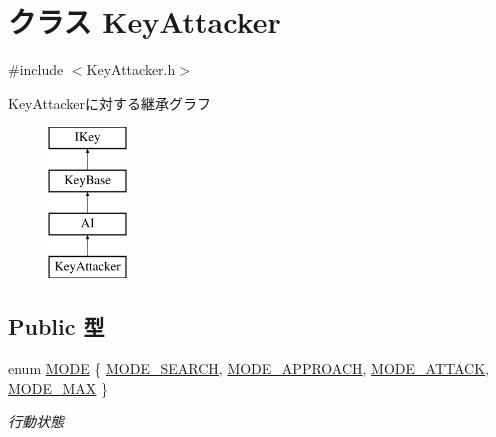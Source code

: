 \hypertarget{class_key_attacker}{\section{クラス Key\-Attacker}
\label{class_key_attacker}
}


{\ttfamily \#include $<$Key\-Attacker.\-h$>$}

Key\-Attackerに対する継承グラフ\begin{figure}[H]
\begin{center}
\leavevmode
\includegraphics[height=4.000000cm]{d9/db2/class_key_attacker}
\end{center}
\end{figure}
\subsection*{Public 型}
{\bf }\par
\begin{DoxyCompactItemize}
\item 
enum \hyperlink{class_key_attacker_a921f9ecc037fd96882bc46418c68cb95}{M\-O\-D\-E} \{ \hyperlink{class_key_attacker_a921f9ecc037fd96882bc46418c68cb95a8c472b37aff5b224022e8383033e7755}{M\-O\-D\-E\-\_\-\-S\-E\-A\-R\-C\-H}, 
\hyperlink{class_key_attacker_a921f9ecc037fd96882bc46418c68cb95a380e54d8f3229f925b6cfb7d480fa5e1}{M\-O\-D\-E\-\_\-\-A\-P\-P\-R\-O\-A\-C\-H}, 
\hyperlink{class_key_attacker_a921f9ecc037fd96882bc46418c68cb95a800ee1b8c2000703bed07c5cee9d66cb}{M\-O\-D\-E\-\_\-\-A\-T\-T\-A\-C\-K}, 
\hyperlink{class_key_attacker_a921f9ecc037fd96882bc46418c68cb95ac1a55ea42133ef7062efa6eae48b99b3}{M\-O\-D\-E\-\_\-\-M\-A\-X}
 \}
\begin{DoxyCompactList}\small\item\em 行動状態 \end{DoxyCompactList}\end{DoxyCompactItemize}

